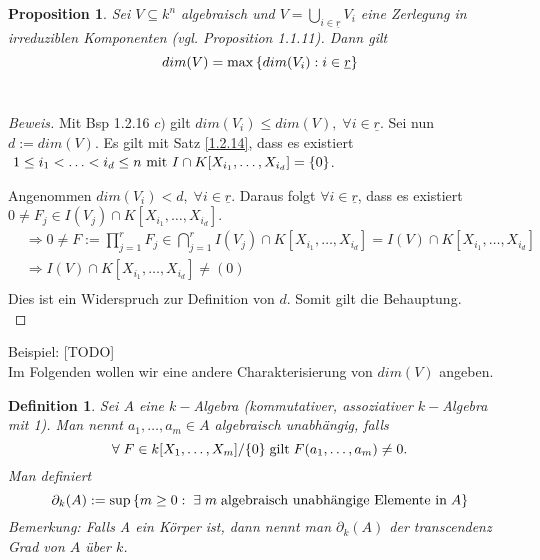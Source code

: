 \documentclass{article}
\newtheorem{definition}[satz]{Definition}
\newtheorem{proposition}[satz]{Proposition}
\newcommand*{\indx}[2]{{#1}_{#2}}
\begin{document}
\begin{proposition}
	Sei $V\subseteq k^n$ algebraisch und $V=\bigcup\limits_{i\in\underline{r}}\indx{V}{i}$ eine Zerlegung in irreduziblen Komponenten (vgl. Proposition 1.1.11). Dann gilt
	\begin{displaymath}
	dim(V)=\max{\{dim(\indx{V}{i}):i\in\underline{r}\}}\\
	\end{displaymath}
	\\
\end{proposition}
\begin{proof}[Beweis]
	Mit Bsp 1.2.16 $c)$ gilt $dim(\indx{V}{i})\leq dim(V),\; \forall i\in \underline{r} $. Sei nun $d:=dim(V)$. Es gilt mit Satz \ref{1.2.14}, dass es existiert $\; 1\leq\indx{i}{1}<\ldots<\indx{i}{d}\leq n \textnormal{ mit } I\cap K[\indx{X}{\indx{i}{1}},\ldots,\indx{X}{\indx{i}{d}}]=\{0\}$.
	
	Angenommen $dim(\indx{V}{i})<d,\; \forall i\in \underline{r}$. Daraus folgt $\forall i\in \underline{r}$, dass es existiert $0\neq\indx{F}{j}\in I(\indx{V}{j})\cap K[\indx{X}{\indx{i}{1}},\ldots,\indx{X}{\indx{i}{d}}]$.
	\begin{align*}
	&\Rightarrow 0\neq F:=\prod_{j=1}^{r}\indx{F}{j}\in \bigcap\limits_{j=1}^{r}I(\indx{V}{j}) \cap K[\indx{X}{\indx{i}{1}},\ldots,\indx{X}{\indx{i}{d}}]=I(V) \cap K[\indx{X}{\indx{i}{1}},\ldots,\indx{X}{\indx{i}{d}}]\\&
	\Rightarrow I(V)\cap K[\indx{X}{\indx{i}{1}},\ldots,\indx{X}{\indx{i}{d}}]\neq (0)\\
	\end{align*}
	Dies ist ein Widerspruch zur Definition von $d$. Somit gilt die Behauptung.\\
\end{proof}

Beispiel: [TODO]\\

Im Folgenden wollen wir eine andere Charakterisierung von $dim(V)$ angeben. 
\begin{definition}
	Sei $A$ eine $k-$Algebra (kommutativer, assoziativer $k-$Algebra mit 1). Man nennt $\indx{a}{1},\ldots,\indx{a}{m}\in A$ algebraisch unabhängig, falls 
	\begin{displaymath}
	\forall \;F\in k[\indx{X}{1},\ldots,\indx{X}{m}]/\{0\} \;\textnormal{gilt}\; F(\indx{a}{1},\ldots,\indx{a}{m})\neq0.
	\end{displaymath}
	Man definiert
	\begin{displaymath}
	\indx{\partial}{k}(A):=\sup{\{m\geq0:\;\exists\; m \;\textnormal{algebraisch unabhängige Elemente in}\; A\}}
	\end{displaymath}
	Bemerkung: Falls A ein Körper ist, dann nennt man $\indx{\partial}{k}(A)$ der transcendenz Grad von $A$ über $k$.\\
\end{definition}
\end{document}
